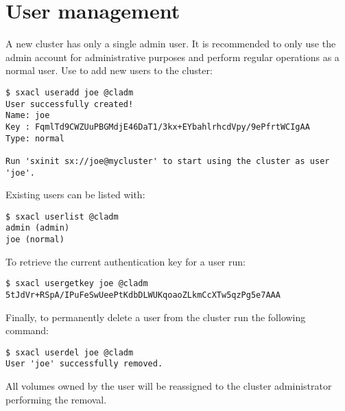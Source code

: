 \section{User management}
A new cluster has only a single admin user. It is recommended to only use the
admin account for administrative purposes and perform regular operations
as a normal user. Use  to add new users to the cluster:
\begin{lstlisting}
$ sxacl useradd joe @cladm
User successfully created!
Name: joe
Key : FqmlTd9CWZUuPBGMdjE46DaT1/3kx+EYbahlrhcdVpy/9ePfrtWCIgAA
Type: normal

Run 'sxinit sx://joe@mycluster' to start using the cluster as user 'joe'.
\end{lstlisting}
Existing users can be listed with:
\begin{lstlisting}
$ sxacl userlist @cladm
admin (admin)
joe (normal)
\end{lstlisting}
To retrieve the current authentication key for a user run:
\begin{lstlisting}
$ sxacl usergetkey joe @cladm
5tJdVr+RSpA/IPuFeSwUeePtKdbDLWUKqoaoZLkmCcXTw5qzPg5e7AAA
\end{lstlisting}
Finally, to permanently delete a user from the cluster run the following
command:
\begin{lstlisting}
$ sxacl userdel joe @cladm
User 'joe' successfully removed.
\end{lstlisting}
All volumes owned by the user will be reassigned to the cluster
administrator performing the removal.
